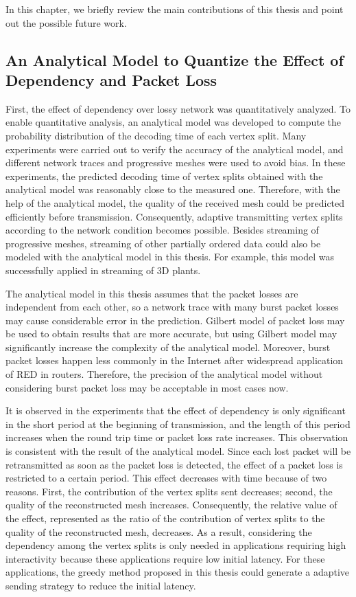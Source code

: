 \documentclass[11pt, a4paper]{report}
\begin{document}
In this chapter, we briefly review the main contributions of this thesis and point
out the possible future work.

\subsection{An Analytical Model to Quantize the Effect of Dependency and Packet Loss}
First, the effect of dependency over lossy network was quantitatively analyzed. 
To enable quantitative analysis, an analytical model was developed to compute 
the probability distribution of the decoding time of each vertex split. 
Many experiments were carried out to verify the accuracy of the analytical model, 
and different network traces and progressive meshes were used to avoid bias. 
In these experiments, the predicted decoding time of vertex splits obtained 
with the analytical model was reasonably close to the measured one. 
Therefore, with the help of the analytical model, 
the quality of the received mesh could be predicted efficiently before transmission.
Consequently, adaptive transmitting vertex splits according to the network condition
becomes possible. Besides streaming of progressive meshes, 
streaming of other partially ordered data could also be modeled
with the analytical model in this thesis. 
For example, this model was successfully applied in streaming of 3D plants.

The analytical model in this thesis assumes that the packet losses 
are independent from each other, 
so a network trace with many burst packet losses may cause considerable error in the prediction. 
Gilbert model of packet loss may be used to obtain results that are more accurate, 
but using Gilbert model may significantly increase the complexity of the analytical model. 
Moreover, burst packet losses happen less commonly in the Internet
after widespread application of RED in routers. 
Therefore, the precision of the analytical model
without considering burst packet loss may be acceptable in most cases now.

It is observed in the experiments that the effect of dependency
is only significant in the short period at the beginning of transmission, 
and the length of this period increases
when the round trip time or packet loss rate increases. 
This observation is consistent with the result of the analytical model. 
Since each lost packet will be retransmitted as soon as the packet loss is detected, 
the effect of a packet loss is restricted to a certain period. 
This effect decreases with time because of two reasons. 
First, the contribution of the vertex splits sent decreases; 
second, the quality of the reconstructed mesh increases. 
Consequently, the relative value of the effect, 
represented as the ratio of the contribution of vertex
splits to the quality of the reconstructed mesh, decreases.
As a result, considering the dependency among the vertex splits 
is only needed in applications requiring high interactivity
because these applications require low initial latency. 
For these applications, the greedy method proposed in this thesis
could generate a adaptive sending strategy to reduce the initial latency. 
\end{document}
